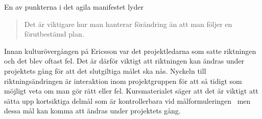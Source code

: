En av punkterna i det agila manifestet lyder
\begin{quote}
Det är viktigare hur man hanterar förändring än att man följer en förutbestämd plan.
\end{quote}
Innan kulturövergången på Ericsson var det projektledarna som satte riktningen och det blev oftast fel. Det är därför viktigt att riktningen kan ändras under projektets gång för att det slutgiltiga målet ska nås. Nyckeln till riktningsändringen är interaktion inom projektgruppen för att så tidigt som möjligt veta om man gör rätt eller fel. Kursmaterialet säger att det är viktigt att sätta upp kortsiktiga delmål som är kontrollerbara vid målformuleringen~\citep{projekt} men dessa mål kan komma att ändras under projektets gång.
